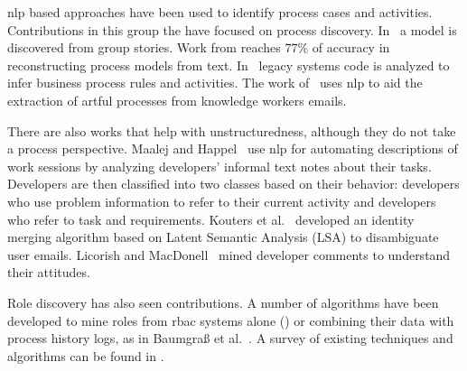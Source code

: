 \documentclass[a4paper,11pt]{article}
\begin{document}


\gls{nlp} based approaches have been used to identify process cases and activities. Contributions in this group the have focused on process discovery. In~\cite{Goncalves2009a} a model is discovered from group stories. Work from \cite{Friedrich2011} reaches 77\% of accuracy in reconstructing process models from text. In~\cite{DoNascimento2012} legacy systems code is analyzed to infer business process rules and activities. The work of~\cite{DiCiccio2013} uses \gls{nlp} to aid the extraction of artful processes from knowledge workers emails.

There are also works that help with unstructuredness, although they do not take a process perspective. Maalej and Happel~\cite{Maalej2010} use \gls*{nlp} for automating descriptions of work sessions by analyzing developers' informal text notes about their tasks. Developers are then classified into two classes based on their behavior: developers who use problem information to refer to their current activity and developers who refer to task and requirements. Kouters et al.~\cite{Kouters2012} developed an identity merging algorithm based on Latent Semantic Analysis (LSA) to disambiguate user emails. Licorish and MacDonell~\cite{Licorish2014} mined developer comments to understand their attitudes.

Role discovery has also seen contributions. A number of algorithms have been developed to mine roles from \gls*{rbac} systems alone (\cite{Lu2015,frank2013role}) or combining their data with process history logs, as in Baumgraß et al.~\cite{baumgrass2012deriving}. A survey of existing techniques and algorithms can be found in \cite{Mitra2016}.
\end{document}
